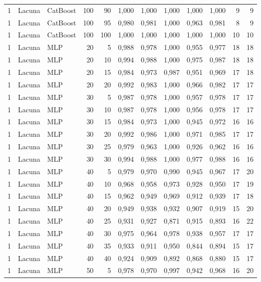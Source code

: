 \begin{longtable}{@{}rllrrrrrrrrr@{}}
1 & Lacuna & CatBoost & 100 & 90 & 1,000 & 1,000 & 1,000 & 1,000 & 1,000 & 9 & 9 \\
1 & Lacuna & CatBoost & 100 & 95 & 0,980 & 0,981 & 1,000 & 0,963 & 0,981 & 8 & 9 \\
1 & Lacuna & CatBoost & 100 & 100 & 1,000 & 1,000 & 1,000 & 1,000 & 1,000 & 10 & 10 \\
1 & Lacuna & MLP & 20 & 5 & 0,988 & 0,978 & 1,000 & 0,955 & 0,977 & 18 & 18 \\
1 & Lacuna & MLP & 20 & 10 & 0,994 & 0,988 & 1,000 & 0,975 & 0,987 & 18 & 18 \\
1 & Lacuna & MLP & 20 & 15 & 0,984 & 0,973 & 0,987 & 0,951 & 0,969 & 17 & 18 \\
1 & Lacuna & MLP & 20 & 20 & 0,992 & 0,983 & 1,000 & 0,966 & 0,982 & 17 & 17 \\
1 & Lacuna & MLP & 30 & 5 & 0,987 & 0,978 & 1,000 & 0,957 & 0,978 & 17 & 17 \\
1 & Lacuna & MLP & 30 & 10 & 0,987 & 0,978 & 1,000 & 0,956 & 0,978 & 17 & 17 \\
1 & Lacuna & MLP & 30 & 15 & 0,984 & 0,973 & 1,000 & 0,945 & 0,972 & 16 & 16 \\
1 & Lacuna & MLP & 30 & 20 & 0,992 & 0,986 & 1,000 & 0,971 & 0,985 & 17 & 17 \\
1 & Lacuna & MLP & 30 & 25 & 0,979 & 0,963 & 1,000 & 0,926 & 0,962 & 16 & 16 \\
1 & Lacuna & MLP & 30 & 30 & 0,994 & 0,988 & 1,000 & 0,977 & 0,988 & 16 & 16 \\
1 & Lacuna & MLP & 40 & 5 & 0,979 & 0,970 & 0,990 & 0,945 & 0,967 & 17 & 20 \\
1 & Lacuna & MLP & 40 & 10 & 0,968 & 0,958 & 0,973 & 0,928 & 0,950 & 17 & 19 \\
1 & Lacuna & MLP & 40 & 15 & 0,962 & 0,949 & 0,969 & 0,912 & 0,939 & 17 & 18 \\
1 & Lacuna & MLP & 40 & 20 & 0,949 & 0,938 & 0,932 & 0,907 & 0,919 & 15 & 20 \\
1 & Lacuna & MLP & 40 & 25 & 0,931 & 0,927 & 0,871 & 0,915 & 0,893 & 16 & 22 \\
1 & Lacuna & MLP & 40 & 30 & 0,975 & 0,964 & 0,978 & 0,938 & 0,957 & 17 & 17 \\
1 & Lacuna & MLP & 40 & 35 & 0,933 & 0,911 & 0,950 & 0,844 & 0,894 & 15 & 17 \\
1 & Lacuna & MLP & 40 & 40 & 0,924 & 0,909 & 0,892 & 0,868 & 0,880 & 15 & 17 \\
1 & Lacuna & MLP & 50 & 5 & 0,978 & 0,970 & 0,997 & 0,942 & 0,968 & 16 & 20 \\

\end{longtable}
